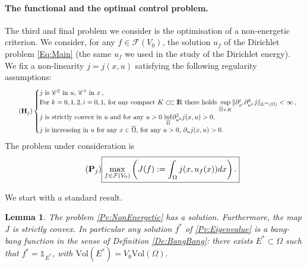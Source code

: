 \documentclass{article}
\newcommand{\R}{\textnormal{I\kern-0.21emR}}
\newtheorem{lemma}[material]{Lemma}
\def\O{{\Omega}}
\numberwithin{equation}{section}
\begin{document}
\paragraph{The  functional and the optimal control problem.}
The third and final problem we consider is the optimisation of a non-energetic criterion. We consider, for any $f\in \mathcal F(V_0)$, the solution $u_f$ of the Dirichlet problem \eqref{Eq:Main} (the same $u_f$ we used in the study of the Dirichlet energy). We fix a non-linearity $j=j(x,u)$ satisfying the following regularity assumptions:
\begin{equation}\label{Hyp:j}\tag{$\bold{H}_j$}
\begin{cases}
j\text{ is $\mathscr C^2$ in $u$, $\mathscr C^1$ in $x$}\,, 
\\  \text{For $k=0,1,2,i=0,1$, for any compact $K\subset\joinrel\subset\R$ there holds }\underset{\overline\O\times K}\sup \Vert \partial_{x^i}^i \partial^k_{u^k}j\Vert_{L^\infty(\O)}<\infty\,, 
\\ \text{$j$ is strictly convex in $u$ and for any $u>0$ $\underset{\overline\O}\inf \partial^2_{u^2} j(x,u)>0$,}
\\ \text{$j$ is increasing in $u$ for any $x\in \overline \O$, for any $u>0$, $\partial_uj(x,u)>0$.}
\end{cases}
\end{equation}
The problem under consideration is 
\begin{equation}\tag{$\bold{P}_j$}\label{Pv:NonEnergetic}
\fbox{$\displaystyle \max_{f\in \mathcal F(V_0)}\left(J(f):=\int_\O j(x,u_f(x))dx\right).
$}
\end{equation}

We start with a standard result.
\begin{lemma}\label{Le:BasicNonEnergetic}
The problem \eqref{Pv:NonEnergetic} has a solution. Furthermore, the map $J$ is strictly convex. In particular any solution $f^*$ of \eqref{Pv:Eigenvalue} is a bang-bang function in the sense of Definition \ref{De:BangBang}: there exists $E^*\subset \O$ such that $f^*=\mathds 1_{E^*}$, with $\mathrm{Vol}(E^*)=V_0\mathrm{Vol}(\O).$ 
\end{lemma}
\end{document}
